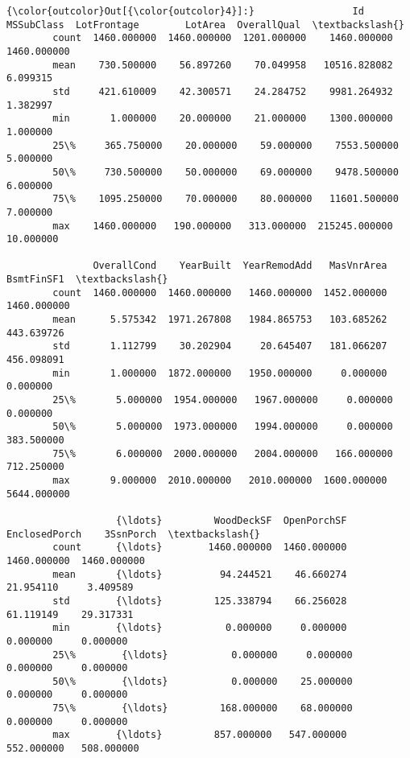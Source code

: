 \documentclass[11pt]{article}
\begin{document}
\begin{Verbatim}[commandchars=\\\{\}]
{\color{outcolor}Out[{\color{outcolor}4}]:}                 Id   MSSubClass  LotFrontage        LotArea  OverallQual  \textbackslash{}
        count  1460.000000  1460.000000  1201.000000    1460.000000  1460.000000   
        mean    730.500000    56.897260    70.049958   10516.828082     6.099315   
        std     421.610009    42.300571    24.284752    9981.264932     1.382997   
        min       1.000000    20.000000    21.000000    1300.000000     1.000000   
        25\%     365.750000    20.000000    59.000000    7553.500000     5.000000   
        50\%     730.500000    50.000000    69.000000    9478.500000     6.000000   
        75\%    1095.250000    70.000000    80.000000   11601.500000     7.000000   
        max    1460.000000   190.000000   313.000000  215245.000000    10.000000   
        
               OverallCond    YearBuilt  YearRemodAdd   MasVnrArea   BsmtFinSF1  \textbackslash{}
        count  1460.000000  1460.000000   1460.000000  1452.000000  1460.000000   
        mean      5.575342  1971.267808   1984.865753   103.685262   443.639726   
        std       1.112799    30.202904     20.645407   181.066207   456.098091   
        min       1.000000  1872.000000   1950.000000     0.000000     0.000000   
        25\%       5.000000  1954.000000   1967.000000     0.000000     0.000000   
        50\%       5.000000  1973.000000   1994.000000     0.000000   383.500000   
        75\%       6.000000  2000.000000   2004.000000   166.000000   712.250000   
        max       9.000000  2010.000000   2010.000000  1600.000000  5644.000000   
        
                   {\ldots}         WoodDeckSF  OpenPorchSF  EnclosedPorch    3SsnPorch  \textbackslash{}
        count      {\ldots}        1460.000000  1460.000000    1460.000000  1460.000000   
        mean       {\ldots}          94.244521    46.660274      21.954110     3.409589   
        std        {\ldots}         125.338794    66.256028      61.119149    29.317331   
        min        {\ldots}           0.000000     0.000000       0.000000     0.000000   
        25\%        {\ldots}           0.000000     0.000000       0.000000     0.000000   
        50\%        {\ldots}           0.000000    25.000000       0.000000     0.000000   
        75\%        {\ldots}         168.000000    68.000000       0.000000     0.000000   
        max        {\ldots}         857.000000   547.000000     552.000000   508.000000   
        

\end{Verbatim}
\end{document}
